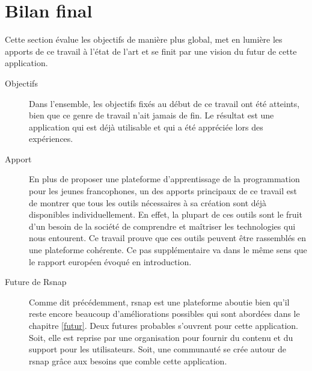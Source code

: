 \section{Bilan final}
Cette section évalue les objectifs de manière plus global, met en lumière les apports de ce travail à l'état de l'art et se finit par une vision du futur de cette application.

\begin{description}
  \item[Objectifs] Dans l'ensemble, les objectifs fixés au début de ce travail ont été atteints, bien que ce genre de travail n'ait jamais de fin. Le résultat est une application qui est déjà utilisable et qui a été appréciée lors des expériences.

  \item[Apport] En plus de proposer une plateforme d'apprentissage de la programmation pour les jeunes francophones, un des apports principaux de ce travail est de montrer que tous les outils nécessaires à sa création sont déjà disponibles individuellement. En effet, la plupart de ces outils sont le fruit d'un besoin de la société de comprendre et maîtriser les technologies qui nous entourent. Ce travail prouve que ces outils peuvent être rassemblés en une plateforme cohérente. Ce pas supplémentaire va dans le même sens que le rapport européen \cite{rapport-europeen} évoqué en introduction.

  \item[Future de Rsnap] Comme dit précédemment, \gls{rsnap} est une plateforme aboutie bien qu'il reste encore beaucoup d'améliorations possibles qui sont abordées dans le chapitre \ref{futur}. Deux futures probables s'ouvrent pour cette application. Soit, elle est reprise par une organisation pour fournir du contenu et du support pour les utilisateurs. Soit, une communauté se crée autour de \gls{rsnap} grâce aux besoins que comble cette application.

\end{description}
